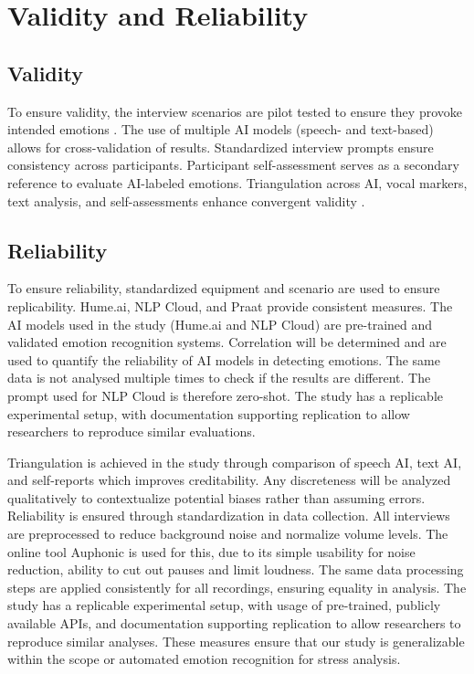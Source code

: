 \section{Validity and Reliability}
\subsection{Validity}
To ensure validity, the interview scenarios are pilot tested to ensure they provoke intended emotions \autocite{Bryman2022}. The use of multiple AI models (speech- and text-based) allows for cross-validation of results. Standardized interview prompts ensure consistency across participants. Participant self-assessment serves as a secondary reference to evaluate AI-labeled emotions. Triangulation across AI, vocal markers, text analysis, and self-assessments enhance convergent validity \autocite{Creswell2023}. 

\subsection{Reliability}
To ensure reliability, standardized equipment and scenario are used to ensure replicability. Hume.ai, NLP Cloud, and Praat provide consistent measures. The AI models used in the study (Hume.ai and NLP Cloud) are pre-trained and validated emotion recognition systems. Correlation will be determined and are used to quantify the reliability of AI models in detecting emotions. 
The same data is not analysed multiple times to check if the results are different. The prompt used for NLP Cloud is therefore zero-shot. 
The study has a replicable experimental setup, with documentation supporting replication to allow researchers to reproduce similar evaluations.  

Triangulation is achieved in the study through comparison of speech AI, text AI, and self-reports which improves creditability. Any discreteness will be analyzed qualitatively to contextualize potential biases rather than assuming errors. 
Reliability is ensured through standardization in data collection. All interviews are preprocessed to reduce background noise and normalize volume levels. The online tool Auphonic \autocite{Auphonic} is used for this, due to its simple usability for noise reduction, ability to cut out pauses and limit loudness. The same data processing steps are applied consistently for all recordings, ensuring equality in analysis. The study has a replicable experimental setup, with usage of pre-trained, publicly available APIs, and documentation supporting replication to allow researchers to reproduce similar analyses. These measures ensure that our study is generalizable within the scope or automated emotion recognition for stress analysis. 

